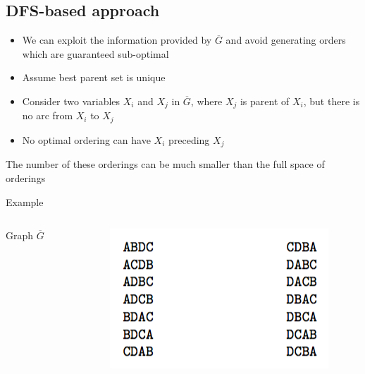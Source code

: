 \subsection{DFS-based approach}
	\begin{frame}
		\begin{itemize}
			\item We can exploit the information provided by $\overline G$ and avoid generating orders which are guaranteed sub-optimal
			\item Assume \alert{best parent set} is unique
			\item Consider two variables $X_i$ and $X_j$ in $\overline G$, where $X_j$ is parent of $X_i$, but there is no arc from $X_i$ to $X_j$
			\item No optimal ordering can have $X_i$ preceding $X_j$
		\end{itemize}
		The number of these orderings can be much smaller than the full space of orderings
	\end{frame}
	\begin{frame}{Example}
		\begin{columns}
			\begin{column}{.48\textwidth}
				\begin{figure}
					\centering
					
				\end{figure}
				\centering
				Graph $\overline G$
			\end{column}
			\begin{column}{.48\textwidth}
				\begin{figure}
					\centering
					\includegraphics{images/dfsorders}
				\end{figure}
			\end{column}
		\end{columns}
	\end{frame}
